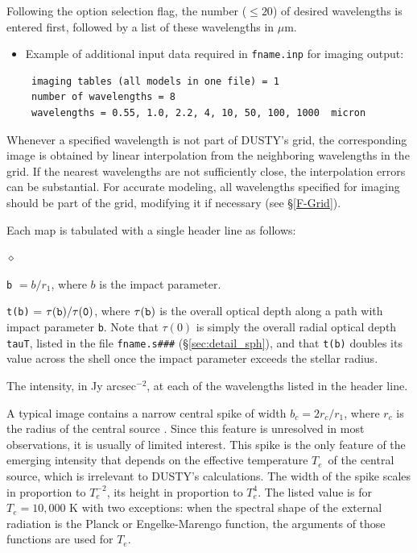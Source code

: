 \documentclass[11pt]{article}
\def\D    {{\sf DUSTY}}
\def\mic    {\hbox{$\mu$m}}
\def\Te   {\hbox{$T_e$}}
\begin{document}
Following the option selection flag, the number ($\le 20$) of desired
wavelengths is entered first, followed by a list of these wavelengths
in \mic.

\begin{itemize}
\item Example of additional input data required in {\tt fname.inp} for
  imaging output:
\begin{verbatim}
 imaging tables (all models in one file) = 1
 number of wavelengths = 8
 wavelengths = 0.55, 1.0, 2.2, 4, 10, 50, 100, 1000  micron
\end{verbatim}
\end{itemize}
Whenever a specified wavelength is not part of \D's grid, the
corresponding image is obtained by linear interpolation from the
neighboring wavelengths in the grid.  If the nearest wavelengths are
not sufficiently close, the interpolation errors can be
substantial. For accurate modeling, all wavelengths specified for
imaging should be part of the grid, modifying it if necessary (see
\S\ref{F-Grid}).

Each map is tabulated with a single header line as follows:
\begin{list}{$\diamond$}{}
\item{\tt b} $= b/r_1$, where $b$ is the impact parameter.
\item {\tt t(b)} = $\tau(\tt b)/\tau(0)$, where $\tau(\tt b)$ is the overall
    optical depth along a path with impact parameter {\tt b}. Note that
    $\tau(0)$ is simply the overall radial optical depth {\tt tauT}, listed in
    the file {\tt fname.s\#\#\#} (\S \ref{sec:detail_sph}), and that {\tt t(b)}
    doubles its value across the shell once the impact parameter exceeds the
    stellar radius.
\item The intensity, in Jy arcsec$^{-2}$, at each of the wavelengths
  listed in the header line.
\end{list}

A typical image contains a narrow central spike of width $b_c =
2r_c/r_1$, where $r_c$ is the radius of the central source
\cite{IE96a}.  Since this feature is unresolved in most observations,
it is usually of limited interest.  This spike is the only feature of
the emerging intensity that depends on the effective temperature \Te\
of the central source, which is irrelevant to \D's calculations. The
width of the spike scales in proportion to $T_e^{-2}$, its height in
proportion to $T_e^4$. The listed value is for $T_e = 10,000$ K with
two exceptions: when the spectral shape of the external radiation is
the Planck or Engelke-Marengo function, the arguments of those
functions are used for $T_e$.
\end{document}
